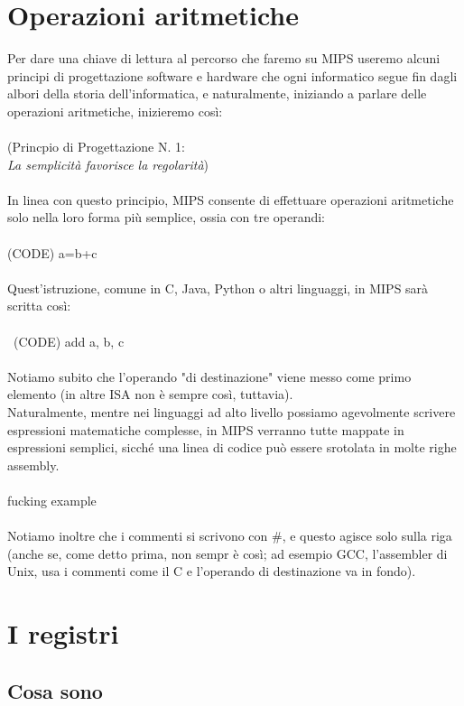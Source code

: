 \documentclass[class=book, crop=false]{standalone}
\begin{document}
\section{Operazioni aritmetiche}
Per dare una chiave di lettura al percorso che faremo su MIPS useremo alcuni principi di progettazione software e hardware che ogni informatico segue fin dagli albori della storia dell'informatica, e naturalmente, iniziando a parlare delle operazioni aritmetiche,  inizieremo così:\\\\
(Princpio di Progettazione N. 1:\\ \textit{La semplicità favorisce la regolarità})\\\\
In linea con questo principio, MIPS consente di effettuare operazioni aritmetiche solo nella loro forma più semplice, ossia con tre operandi:\\\\
(CODE) a=b+c\\\\
Quest'istruzione, comune in C, Java, Python o altri linguaggi, in MIPS sarà scritta così:\\\\\
(CODE) add a, b, c\\\\
Notiamo subito che l'operando "di destinazione" viene messo come primo elemento (in altre ISA non è sempre così, tuttavia).\\
Naturalmente, mentre nei linguaggi ad alto livello possiamo agevolmente scrivere espressioni matematiche complesse, in MIPS verranno tutte mappate in espressioni semplici, sicché una linea di codice può essere srotolata in molte righe assembly.\\\\
fucking example\\\\
Notiamo inoltre che i commenti si scrivono con \#, e questo agisce solo sulla riga (anche se, come detto prima, non sempr è così; ad esempio GCC, l'assembler di Unix, usa i commenti come il C e l'operando di destinazione va in fondo).

\section{I registri}
\subsection{Cosa sono}
\end{document}
